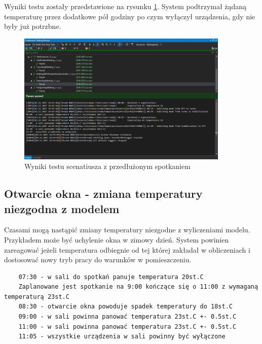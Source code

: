Wyniki testu zostały przedstawione na rysunku \ref{fig:ExtendedMeeting}.
System podtrzymał żądaną temperaturę przez dodatkowe pół godziny po czym wyłączył urządzenia, gdy nie były już potrzbne.
\begin{figure}[hb]
    \centering
    \includegraphics[width=0.90\textwidth]{./screenshots/ExtendedMeeting.png}
    \caption{Wyniki testu scenatiusza z przedłużonym spotkaniem}
    \label{fig:ExtendedMeeting}    
\end{figure}

\subsection{Otwarcie okna - zmiana temperatury niezgodna z modelem}
Czasami mogą nastąpić zmiany temperatury niezgodne z wyliczeniami modelu. 
Przykładem może być uchylenie okna w zimowy dzień. 
System powinien zareagować jeżeli temperatura odbiegnie od tej której zakładał w obliczeniach i dostosować nowy tryb pracy do warunków w pomieszczeniu.
\begin{lstlisting}
    07:30 - w sali do spotkań panuje temperatura 20st.C
    Zaplanowane jest spotkanie na 9:00 kończące się o 11:00 z wymaganą temperaturą 23st.C
    08:30 - otwarcie okna powoduje spadek temperatury do 18st.C 
    09:00 - w sali powinna panować temperatura 23st.C +- 0.5st.C
    11:00 - w sali powinna panować temperatura 23st.C +- 0.5st.C
    11:05 - wszystkie urządzenia w sali powinny być wyłączone
\end{lstlisting}


